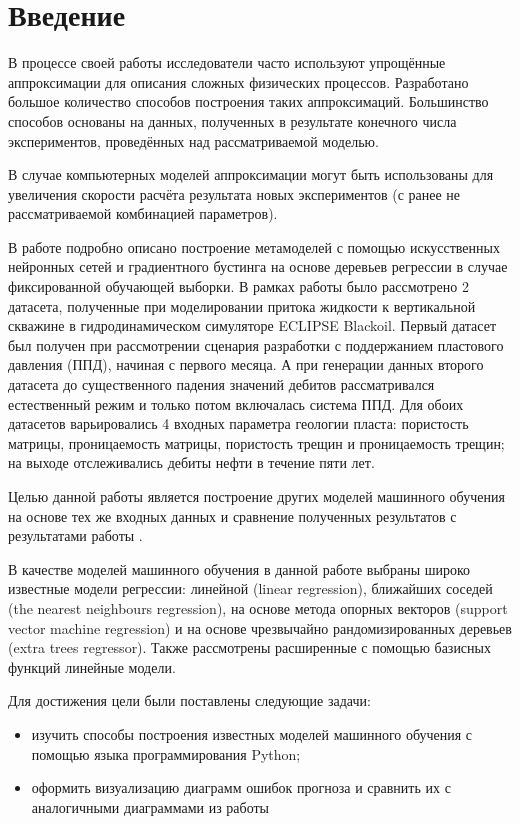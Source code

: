 \chapter*{Введение} %

В процессе своей работы исследователи часто используют упрощённые аппроксимации для описания сложных физических процессов. Разработано большое количество способов построения таких аппроксимаций.
Большинство способов основаны на данных, полученных в результате конечного числа экспериментов, проведённых над рассматриваемой моделью.

В случае компьютерных моделей аппроксимации могут быть использованы для увеличения скорости расчёта результата новых экспериментов (с ранее не рассматриваемой комбинацией параметров).

В работе \cite{muravtsev:metamodel} подробно описано построение метамоделей с помощью искусственных нейронных сетей и градиентного бустинга на основе деревьев регрессии в случае фиксированной обучающей выборки.
В рамках работы \cite{muravtsev:metamodel} было рассмотрено 2 датасета, полученные при моделировании притока жидкости к вертикальной скважине в гидродинамическом симуляторе ECLIPSE Blackoil. Первый датасет был получен при рассмотрении сценария разработки с поддержанием пластового давления (ППД), начиная с первого месяца. А при генерации данных второго датасета до существенного падения значений дебитов рассматривался естественный режим и только потом включалась система ППД. Для обоих датасетов варьировались 4 входных параметра геологии пласта: пористость матрицы, проницаемость матрицы, пористость трещин и проницаемость трещин; на выходе отслеживались дебиты нефти в течение пяти лет.

Целью данной работы является построение других моделей машинного обучения на основе тех же входных данных и сравнение полученных результатов с результатами работы \cite{muravtsev:metamodel}.

В качестве моделей машинного обучения в данной работе выбраны широко известные модели регрессии: линейной (linear regression), ближайших соседей (the nearest neighbours regression), на основе метода опорных векторов (support vector machine regression) и на основе чрезвычайно рандомизированных деревьев (extra trees regressor). Также рассмотрены расширенные с помощью базисных функций линейные модели.

Для достижения цели были поставлены следующие задачи:
\begin{itemize}
	\item изучить способы построения известных моделей машинного обучения с помощью языка программирования Python;
	\item оформить визуализацию диаграмм ошибок прогноза и сравнить их с аналогичными диаграммами из работы \cite{muravtsev:metamodel}
\end{itemize}
